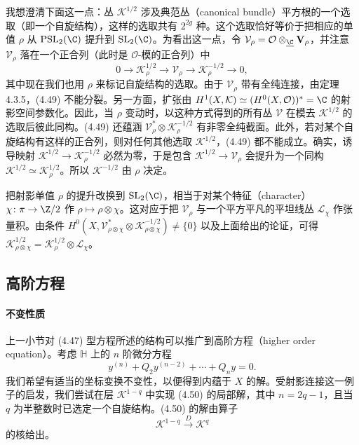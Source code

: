 \begin{remark}
我想澄清下面这一点：丛 $\mathcal{K}^{1/2}$ 涉及典范丛（canonical bundle）平方根的一个选取（即一个自旋结构），这样的选取共有 $2^{2g}$ 种。这个选取恰好等价于把相应的单值 $\rho$ 从 $\mathrm{PSL}_2(\C)$ 提升到 $\mathrm{SL}_2(\C)$。为看出这一点，令 $\mathcal{V}_\rho=\mathcal{O}\otimes_{\underline{\C}}\mathbf{V}_\rho$，并注意 $\mathcal{V}_\rho$ 落在一个正合列（此时是 $\mathcal{O}$-模的正合列）中
\begin{equation}
0\longrightarrow\mathcal{K}^{1/2}_{\rho}\longrightarrow\mathcal{V}_\rho\longrightarrow\mathcal{K}^{-1/2}_{\rho}\longrightarrow0, \tag{4.49}\label{eq:4.49}
\end{equation}
其中现在我们也用 $\rho$ 来标记自旋结构的选取。由于 $\mathcal{V}_\rho$ 带有全纯连接，由定理 4.3.5，(4.49) 不能分裂。另一方面，扩张由 $H^1(X,\mathcal{K})\simeq(H^0(X,\mathcal{O}))^*=\C$ 的射影空间参数化。因此，当 $\rho$ 变动时，以这种方式得到的所有丛 $\mathcal{V}$ 在模去 $\mathcal{K}^{1/2}$ 的选取后彼此同构。(4.49) 还蕴涵 $\mathcal{V}^*_\rho\otimes\mathcal{K}^{-1/2}_\rho$ 有非零全纯截面。此外，若对某个自旋结构有这样的正合列，则对任何其他选取 $\mathcal{K}^{1/2}$，(4.49) 都不能成立。确实，诱导映射 $\mathcal{K}^{1/2}\to\mathcal{K}^{-1/2}_\rho$ 必然为零，于是包含 $\mathcal{K}^{1/2}\to\mathcal{V}_\rho$ 会提升为一个同构 $\mathcal{K}^{1/2}\simeq\mathcal{K}^{1/2}_\rho$。所以 $\mathcal{K}^{-1/2}$ 由 $\rho$ 决定。

把射影单值 $\rho$ 的提升改换到 $\mathrm{SL}_2(\C)$，相当于对某个特征（character）$\chi\colon\pi\to\Z/2$ 作 $\rho\mapsto\rho\otimes\chi$。这对应于把 $\mathcal{V}_\rho$ 与一个平方平凡的平坦线丛 $\mathcal{L}_\chi$ 作张量积。由条件 $H^0(X,\mathcal{V}^*_{\rho\otimes\chi}\otimes\mathcal{K}^{-1/2}_{\rho\otimes\chi})\neq\{0\}$ 以及上面给出的论证，可得 $\mathcal{K}^{1/2}_{\rho\otimes\chi}=\mathcal{K}^{1/2}_\rho\otimes\mathcal{L}_\chi$。
\end{remark}

\subsection{高阶方程}

\paragraph{不变性质}
上一小节对 (4.47) 型方程所述的结构可以推广到高阶方程（higher order equation）。考虑 $\mathbb{H}$ 上的 $n$ 阶微分方程
\begin{equation}
y^{(n)}+Q_2y^{(n-2)}+\cdots+Q_ny=0. \tag{4.50}\label{eq:4.50}
\end{equation}
我们希望有适当的坐标变换不变性，以便得到内蕴于 $X$ 的解。受射影连接这一例子的启发，我们尝试在层 $\mathcal{K}^{1-q}$ 中实现 (4.50) 的局部解，其中 $n=2q-1$，且当 $q$ 为半整数时已选定一个自旋结构。(4.50) 的解由算子
\[
\mathcal{K}^{1-q}\xrightarrow{\ D\ }\mathcal{K}^{q}
\]
的核给出。

